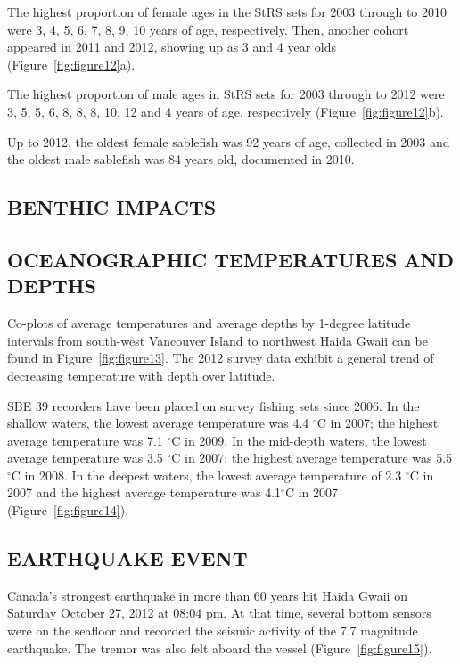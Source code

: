 \documentclass[12pt]{article}\usepackage[]{graphicx}\usepackage[]{color}
\begin{document}
The highest proportion of female ages in the StRS sets for 2003 through to 2010 were 3, 4, 5, 6, 7, 8, 9, 10 years of age, respectively. Then, another cohort appeared in 2011 and 2012, showing up as 3 and 4 year olds (Figure~\ref{fig:figure12}a).

The highest proportion of male ages in StRS sets for 2003 through to 2012 were 3, 5, 5, 6, 8, 8, 8, 10, 12 and 4 years of age, respectively (Figure~\ref{fig:figure12}b).

Up to 2012, the oldest female sablefish was 92 years of age, collected in 2003 and the oldest male sablefish was 84 years old, documented in 2010.

\hypertarget{benthic-impacts}{%
\subsection{BENTHIC IMPACTS}\label{benthic-impacts}}

\hypertarget{oceanographic-temperatures-and-depths}{%
\subsection{OCEANOGRAPHIC TEMPERATURES AND DEPTHS}\label{oceanographic-temperatures-and-depths}}

Co-plots of average temperatures and average depths by 1-degree latitude intervals from south-west Vancouver Island to northwest Haida Gwaii can be found in Figure~\ref{fig:figure13}. The 2012 survey data exhibit a general trend of decreasing temperature with depth over latitude.

SBE 39 recorders have been placed on survey fishing sets since 2006. In the shallow waters, the lowest average temperature was 4.4 \(^\circ\)C in 2007; the highest average temperature was 7.1 \(^\circ\)C in 2009. In the mid-depth waters, the lowest average temperature was 3.5 \(^\circ\)C in 2007; the highest average temperature was 5.5 \(^\circ\)C in 2008. In the deepest waters, the lowest average temperature of 2.3 \(^\circ\)C in 2007 and the highest average temperature was 4.1\(^\circ\)C in 2007 (Figure~\ref{fig:figure14}).

\hypertarget{earthquake-event}{%
\subsection{EARTHQUAKE EVENT}\label{earthquake-event}}

Canada's strongest earthquake in more than 60 years hit Haida Gwaii on Saturday October 27, 2012 at 08:04 pm. At that time, several bottom sensors were on the seafloor and recorded the seismic activity of the 7.7 magnitude earthquake. The tremor was also felt aboard the vessel (Figure~\ref{fig:figure15}).
\end{document}
